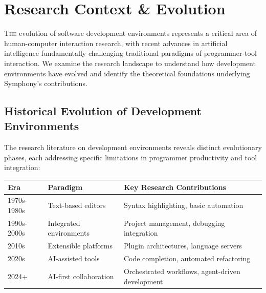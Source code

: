 
\section{Research Context \& Evolution}
\label{sec:research-context}

\lettrine{T}{he} evolution of software development environments represents a critical area of human-computer interaction research, with recent advances in artificial intelligence fundamentally challenging traditional paradigms of programmer-tool interaction. We examine the research landscape to understand how development environments have evolved and identify the theoretical foundations underlying Symphony's contributions.

\subsection{Historical Evolution of Development Environments}
\label{subsec:historical-evolution}

The research literature on development environments reveals distinct evolutionary phases, each addressing specific limitations in programmer productivity and tool integration:

\begin{center}
\begin{tabular}{@{}lll@{}}
\toprule
\textbf{Era} & \textbf{Paradigm} & \textbf{Key Research Contributions} \\
\midrule
1970s-1980s & Text-based editors & Syntax highlighting, basic automation \\
1990s-2000s & Integrated environments & Project management, debugging integration \\
2010s & Extensible platforms & Plugin architectures, language servers \\
2020s & AI-assisted tools & Code completion, automated refactoring \\
2024+ & AI-first collaboration & Orchestrated workflows, agent-driven development \\
\bottomrule
\end{tabular}
\label{tab:evolution-paradigms}
\end{center}

